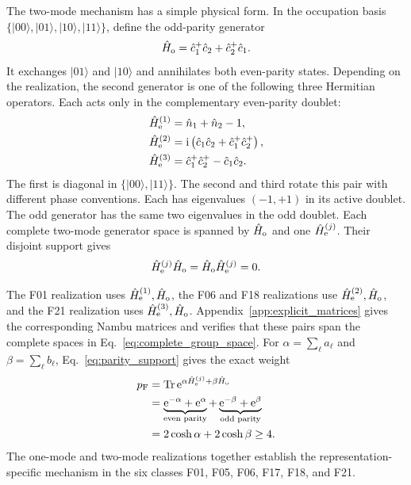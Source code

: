 \documentclass[onecolumn,aps,prb,amsmath,amssymb,superscriptaddress,longbibliography]{revtex4-2}
\newcommand{\Tr}{\operatorname{Tr}}
\newcommand{\ee}{\mathrm{e}}
\newcommand{\ii}{\mathrm{i}}
\begin{document}
The two-mode mechanism has a simple physical form.  In the occupation basis
\(\{|00\rangle,|01\rangle,|10\rangle,|11\rangle\}\), define the odd-parity
generator
\begin{equation}
    \hat H_{\rm o}
    =\hat c_1^+\hat c_2+\hat c_2^+\hat c_1 .
    \label{eq:odd_parity_generator}
\end{equation}
It exchanges \(|01\rangle\) and \(|10\rangle\) and annihilates both
even-parity states.  Depending on the realization, the second generator is one
of the following three Hermitian operators.  Each acts only in the
complementary even-parity doublet:
\begin{align}
    \hat H_{\rm e}^{(1)}
      &=\hat n_1+\hat n_2-1,\notag\\
    \hat H_{\rm e}^{(2)}
      &=\ii\left(\hat c_1\hat c_2+
        \hat c_1^+\hat c_2^+\right),\notag\\
    \hat H_{\rm e}^{(3)}
      &=\hat c_1^+\hat c_2^+-\hat c_1\hat c_2 .
    \label{eq:even_parity_generators}
\end{align}
The first is diagonal in \(\{|00\rangle,|11\rangle\}\).  The second and third
rotate this pair with different phase conventions.  Each has eigenvalues
\((-1,+1)\) in its active doublet.  The odd generator has the same two
eigenvalues in the odd doublet.  Each complete two-mode generator space is
spanned by \(\hat H_{\rm o}\) and one \(\hat H_{\rm e}^{(j)}\).  Their disjoint
support gives
\begin{equation}
    \hat H_{\rm e}^{(j)}\hat H_{\rm o}
    =\hat H_{\rm o}\hat H_{\rm e}^{(j)}=0 .
    \label{eq:parity_support}
\end{equation}

The F01 realization uses
\(\hat H_{\rm e}^{(1)},\hat H_{\rm o}\), the F06 and F18 realizations use
\(\hat H_{\rm e}^{(2)},\hat H_{\rm o}\), and the F21 realization uses
\(\hat H_{\rm e}^{(3)},\hat H_{\rm o}\).  Appendix~\ref{app:explicit_matrices}
gives the corresponding Nambu matrices and verifies that these pairs span the
complete spaces in Eq.~\eqref{eq:complete_group_space}.  For
\(\alpha=\sum_\ell a_\ell\) and
\(\beta=\sum_\ell b_\ell\), Eq.~\eqref{eq:parity_support} gives the exact
weight
\begin{equation}
\begin{aligned}
    p_{\rm F}
    &=\Tr\ee^{\alpha\hat H_{\rm e}^{(j)}
                  +\beta\hat H_{\rm o}}\\
    &=\underbrace{\ee^{-\alpha}+\ee^\alpha}_{\text{even parity}}
      +\underbrace{\ee^{-\beta}+\ee^\beta}_{\text{odd parity}}\\
    &=2\cosh\alpha+2\cosh\beta\geq4 .
\end{aligned}
    \label{eq:two_mode_fermion_weight}
\end{equation}
The one-mode and two-mode realizations together establish the
representation-specific mechanism in the six classes F01, F05, F06, F17,
F18, and F21.
\end{document}
